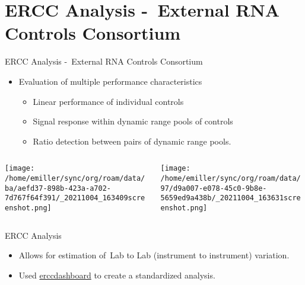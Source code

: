 \documentclass[bigger]{beamer}
\begin{document}
\section{ERCC Analysis - External RNA Controls Consortium}
\label{sec:orgb301009}
\begin{frame}[label={sec:org61ffe79}]{ERCC Analysis - External RNA Controls Consortium}
\begin{itemize}
\item Evaluation of multiple performance characteristics
\begin{itemize}
\item Linear performance of individual controls
\item Signal response within dynamic range pools of controls
\item Ratio detection between pairs of dynamic range pools.
\end{itemize}
\end{itemize}

\begin{columns}
\begin{column}{0.35\columnwidth}
\begin{center}
\texttt{[image: /home/emiller/sync/org/roam/data/ba/aefd37-898b-423a-a702-7d767f64f391/\_20211004\_163409screenshot.png]}
\end{center}
\end{column}

\begin{column}{0.5\columnwidth}
\begin{center}
\texttt{[image: /home/emiller/sync/org/roam/data/97/d9a007-e078-45c0-9b8e-5659ed9a438b/\_20211004\_163631screenshot.png]}
\end{center}
\end{column}
\end{columns}
\end{frame}



\begin{frame}[label={sec:org3938afa}]{ERCC Analysis}
\begin{itemize}
\item Allows for estimation of Lab to Lab (instrument to instrument) variation.
\item Used \href{https://www.bioconductor.org/packages/release/bioc/html/erccdashboard.html}{erccdashboard} to create a standardized analysis.
\end{itemize}
\end{frame}
\end{document}
